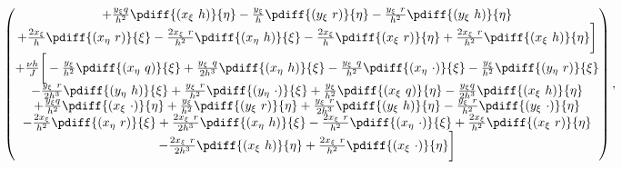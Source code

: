 \begin{align}
\begin{pmatrix}
		+ \frac{y_{\xi}q}{h^2} \pdiff{(x_{\xi}\ h)}{\eta}
		- \frac{y_{\xi}}{h} \pdiff{(y_{\xi}\ r)}{\eta}
		- \frac{y_{\xi}\ r}{h^2} \pdiff{(y_{\xi}\ h)}{\eta} \\
		+ \frac{2 x_{\xi}}{h} \pdiff{(x_{\eta}\ r)}{\xi}
		- \frac{2 x_{\xi}\ r}{h^2} \pdiff{(x_{\eta}\ h)}{\xi}
		- \frac{2 x_{\xi}}{h} \pdiff{(x_{\xi}\ r)}{\eta}
		+ \frac{2 x_{\xi}\ r}{h^2} \pdiff{(x_{\xi}\ h)}{\eta}
		\bigg]\\
		+		\frac{\nu h}{J} \bigg[
		-\frac{y_{\xi} }{h^2} \pdiff{(x_{\eta}\ q)}{\xi}
		+ \frac{y_{\xi}\ q}{2h^3} \pdiff{(x_{\eta}\ h)}{\xi}
		- \frac{y_{\xi}\ q}{h^2} \pdiff{(x_{\eta}\ \cdot)}{\xi}
		- \frac{y_{\xi} }{h^2} \pdiff{(y_{\eta}\ r)}{\xi} \\
		- \frac{y_{\xi}\ r}{2h^3} \pdiff{(y_{\eta}\ h)}{\xi}
		+ \frac{y_{\xi}\ r}{h^2} \pdiff{(y_{\eta}\ \cdot)}{\xi}
		+ \frac{y_{\xi}}{h^2} \pdiff{(x_{\xi}\ q)}{\eta}
		- \frac{y_{\xi}q}{2h^3} \pdiff{(x_{\xi}\ h)}{\eta} \\
		+ \frac{y_{\xi}q}{h^2} \pdiff{(x_{\xi}\ \cdot)}{\eta}
		+ \frac{y_{\xi}}{h^2} \pdiff{(y_{\xi}\ r)}{\eta}
		+ \frac{y_{\xi}\ r}{2h^3} \pdiff{(y_{\xi}\ h)}{\eta}
		- \frac{y_{\xi}\ r}{h^2} \pdiff{(y_{\xi}\ \cdot)}{\eta}\\
		- \frac{2 x_{\xi}}{h^2} \pdiff{(x_{\eta}\ r)}{\xi}
		+ \frac{2 x_{\xi}\ r}{2h^3} \pdiff{(x_{\eta}\ h)}{\xi}
		- \frac{2 x_{\xi}\ r}{h^2} \pdiff{(x_{\eta}\ \cdot)}{\xi}
		+ \frac{2 x_{\xi}}{h^2} \pdiff{(x_{\xi}\ r)}{\eta} \\
		- \frac{2 x_{\xi}\ r}{2h^3} \pdiff{(x_{\xi}\ h)}{\eta}
		+ \frac{2 x_{\xi}\ r}{h^2} \pdiff{(x_{\xi}\ \cdot)}{\eta}
		\bigg]
	\end{pmatrix},
\end{align}

